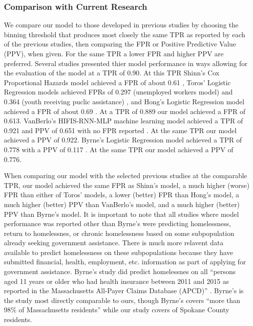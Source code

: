 \documentclass[10pt,letterpaper]{article}
\newcommand{\red}[1]{{\color{red}{#1}}}
\begin{document}
\subsubsection*{Comparison with Current Research}
We compare our model to those developed in previous studies by choosing the binning threshold that produces most closely the same TPR as reported by each of the previous studies, then comparing the FPR or Positive Predictive Value (PPV), when given. For the same TPR a lower FPR and higher PPV are preferred. Several studies presented thier model performance in ways allowing for the evaluation of the model at a TPR of 0.90. At this TPR Shinn's Cox Proportional Hazards model achieved a FPR of about 0.61 \cite{shinn2013efficient}, Toros' Logistic Regression models achieved FPRs of 0.297 (unemployed workers model) and 0.364 (youth receiving puclic assistance) \cite{toros2019early}, and Hong's Logistic Regression model achieved a FPR of about 0.69 \cite{hong2018applications}. At a TPR of 0.889 our model achieved a FPR of 0.613. VanBerlo's HIFIS-RNN-MLP machine learning model achieved a TPR of 0.921 and PPV of 0.651 with no FPR reported \cite{vanberlo2021interpretable}. At the same TPR our model achieved a PPV of 0.922. Byrne's Logistic Regression model achieved a TPR of 0.778 with a PPV of 0.117 \cite{byrne2020classification}. At the same TPR our model achieved a PPV of 0.776. 

When comparing our model with the selected previous studies at the comparable TPR, our model achieved the same FPR as Shinn's model, a much higher (worse) FPR than either of Toros' models, a lower (better) FPR than Hong's model, a much higher (better) PPV than VanBerlo's model, and a much higher (better) PPV than Byrne's model. It is important to note that all studies where model performance was reported other than Byrne's were predicting homelessness, return to homelessnes, or chronic homelessness based on some subpopulation already seeking government assistance. There is much more relavent data available to predict homelessness on these subpopulations because they have submitted financial, health, employment, etc. information as part of applying for government assistance. Byrne's study did predict homelessnes on all ``persons aged 11 years or older who had health insurance between 2011 and 2015 as reported in the Massachusetts All-Payer Claims Database (APCD)'' \cite{byrne2020classification}. Byrne's is the study most directly comparable to ours, though Byrne's covers ``more than 98\% of Massachusetts residents'' \cite{byrne2020classification} while our study covers \red{ADD PERCENT HERE} of Spokane County residents.
\end{document}
